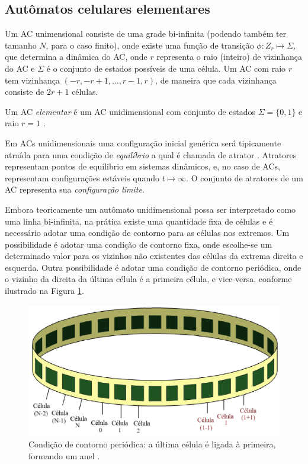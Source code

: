 \documentclass[12pt,a4paper]{article}
\begin{document}
\subsection{Autômatos celulares elementares}

Um AC unimensional consiste de uma grade bi-infinita (podendo também ter tamanho
$N$, para o caso finito), onde existe uma função de transição $\phi: Z_r \mapsto \Sigma$,
que determina a dinâmica do AC, onde $r$ representa o raio (inteiro) de vizinhança do AC e
$\Sigma$ é o conjunto de estados possíveis de uma célula. Um AC com raio $r$ tem
vizinhança $(-r,-r+1,\ldots,r-1,r)$, de maneira que cada vizinhança consiste
de $2r+1$ células.

Um AC \textit{elementar} é um AC unidimensional com conjunto de estados
$\Sigma = \{0,1\}$ e raio $r=1$ .

Em ACs unidimensionais uma configuração inicial genérica será tipicamente atraída
para uma condição de \textit{equilíbrio} a qual é chamada de atrator .
Atratores representam pontos de equílibrio em sistemas dinâmicos, e, no caso de ACs,
representam configurações estáveis quando $t \mapsto \infty$. O conjunto de atratores
de um AC representa sua \textit{configuração limite}.

Embora teoricamente um autômato unidimensional possa ser interpretado como uma linha bi-infinita,
na prática existe uma quantidade fixa de células e é necessário adotar uma condição de contorno
para as células nos extremos. Um possibilidade é adotar uma condição de contorno fixa, onde
escolhe-se um determinado valor para os vizinhos não existentes das células da extrema direita
e esquerda. Outra possibilidade é adotar uma condição de contorno periódica, onde o vizinho
da direita da última célula é a primeira célula, e vice-versa, conforme ilustrado na Figura
\ref{fig:ring}.

\begin{figure}[htp]
\begin{center}
\includegraphics[scale=0.3]{img/ring.eps}
\caption[Condição de contorno periódica]{Condição de contorno periódica:
a última célula é ligada à primeira, formando um anel
.}
\label{fig:ring}
\end{center}
\end{figure}
\end{document}
